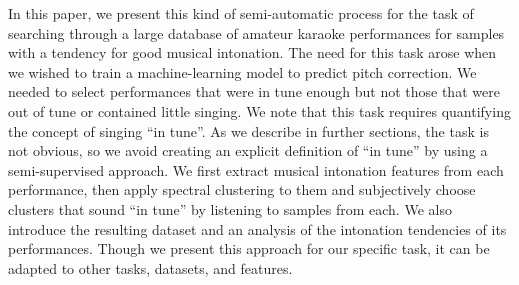 \begin{appendices}
In this paper, we present this kind of semi-automatic process for the task of searching through a large database of amateur karaoke performances for samples with a tendency for good musical intonation. The need for this task arose when we wished to train a machine-learning model to predict pitch correction. We needed to select performances that were in tune enough but not those that were out of tune or contained little singing. We note that this task requires quantifying the concept of singing ``in tune''. As we describe in further sections, the task is not obvious, so we avoid creating an explicit definition of ``in tune'' by using a semi-supervised approach. We first extract musical intonation features from each performance, then apply spectral clustering to them and subjectively choose clusters that sound ``in tune'' by listening to samples from each. We also introduce the resulting dataset and an analysis of the intonation tendencies of its performances. Though we present this approach for our specific task, it can be adapted to other tasks, datasets, and features.


\end{appendices}
